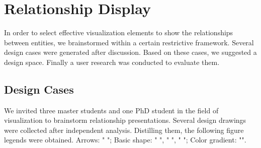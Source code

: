 \section{Relationship Display} 
\noindent In order to select effective visualization elements to show the relationships between entities, we brainstormed within a certain restrictive framework. Several design cases were generated after discussion. Based on these cases, we suggested a design space. Finally a user research was conducted to evaluate them. 
\subsection{Design Cases} %
\noindent We invited three master students and one PhD student in the field of visualization to brainstorm relationship presentations. Several design drawings were collected after independent analysis. Distilling them, the following figure legends were obtained.
 Arrows: "  "; 
 Basic shape: "  ", "  ", "  "; 
 Color gradient: "".

